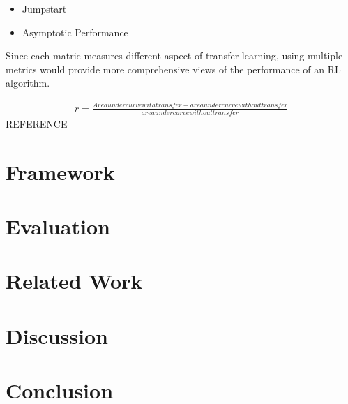 \documentclass[12pt,twoside]{report}
\theoremstyle{plain}
\theoremstyle{definition}
\begin{document}


\begin{itemize}
\item Jumpstart
\item Asymptotic Performance
\end{itemize}

Since each matric measures different aspect of transfer learning, using multiple metrics would provide more comprehensive views of the performance of an RL algorithm.

\begin{equation}
\begin{split}
r = \frac{Area under curve with transfer - area under curve without transfer}{area under curve without transfer}
\end{split}
\end{equation}
REFERENCE


\chapter{Framework}
\label{framework}


\chapter{Evaluation}
\label{evaluation}




\chapter{Related Work}
\label{related_work}



\chapter{Discussion}
\label{discussion}


\chapter{Conclusion}
\label{conclusion}

\clearpage
\appendix
\pagebreak
\begin{appendices}





\end{appendices}






\end{document}
